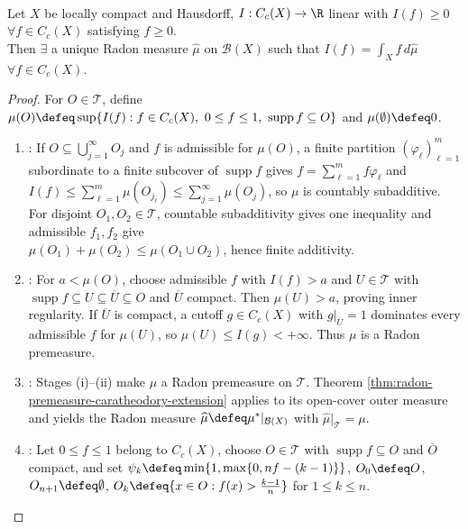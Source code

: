 \begin{theorem} \label{thm:riesz-markov-positive-functional-cc} \\
Let $X$ be locally compact and Hausdorff, $I:C_c(X)\to\R$ linear with $I(f)\geq0$ $\forall f\in C_c(X)$ satisfying $f\geq0$.\\
Then $\exists$ a unique Radon measure $\widehat{\mu}$ on $\mathcal{B}(X)$ such that $I(f)=\int_X f\,d\widehat{\mu}$ $\forall f\in C_c(X)$.
\begin{proof}
For $O\in\mathcal{T}$, define $\mu(O)\defeq\sup\limits\{I(f):f\in C_c(X),\ 0\leq f\leq1,\ \operatorname{supp}f\subseteq O\}$ and $\mu(\emptyset)\defeq0$.
\begin{enumerate}[label=(\roman*)]
\setlength{\itemsep}{0pt}
\item {}: If $O\subseteq\bigcup\limits_{j=1}^\infty O_j$ and $f$ is admissible for $\mu(O)$, a finite partition $(\varphi_\ell)_{\ell=1}^m$ subordinate to a finite subcover of $\operatorname{supp}f$ gives $f=\sum\limits_{\ell=1}^m f\varphi_\ell$ and $I(f)\leq\sum\limits_{\ell=1}^m\mu(O_{j_\ell})\leq\sum\limits_{j=1}^\infty\mu(O_j)$, so $\mu$ is countably subadditive. For disjoint $O_1,O_2\in\mathcal{T}$, countable subadditivity gives one inequality and admissible $f_1,f_2$ give\\
$\mu(O_1)+\mu(O_2)\leq\mu(O_1\cup O_2)$, hence finite additivity.
\item {}: For $a<\mu(O)$, choose admissible $f$ with $I(f)>a$ and $U\in\mathcal{T}$ with $\operatorname{supp}f\subseteq U\subseteq\overline{U}\subseteq O$ and $\overline{U}$ compact. Then $\mu(U)>a$, proving inner regularity. If $\overline{U}$ is compact, a cutoff $g\in C_c(X)$ with $g|_{\overline{U}}=1$ dominates every admissible $f$ for $\mu(U)$, so $\mu(U)\leq I(g)<+\infty$. Thus $\mu$ is a Radon premeasure.
\item {}: Stages (i)--(ii) make $\mu$ a Radon premeasure on $\mathcal{T}$. Theorem \ref{thm:radon-premeasure-caratheodory-extension} applies to its open-cover outer measure and yields the Radon measure $\widehat{\mu}\defeq\mu^\ast|_{\mathcal{B}(X)}$ with $\widehat{\mu}|_{\mathcal{T}}=\mu$.
\item {}: Let $0\leq f\leq1$ belong to $C_c(X)$, choose $O\in\mathcal{T}$ with $\operatorname{supp}f\subseteq O$ and $\overline{O}$ compact, and set $\psi_k\defeq\min\{1,\max\{0,nf-(k-1)\}\}$, $O_0\defeq O$, $O_{n+1}\defeq\emptyset$, $O_k\defeq\{x\in O:f(x)>\frac{k-1}{n}\}$ for $1\leq k\leq n$.\\

\end{enumerate}
\end{proof}
\end{theorem}
